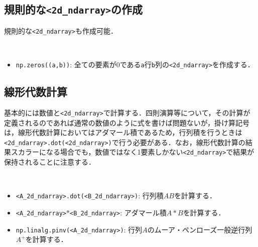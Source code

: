 \subsection{規則的な\texttt{<2d\_ndarray>}の作成}

規則的な\texttt{<2d\_ndarray>}も作成可能．
\begin{gram}　
\begin{itemize}
\item \texttt{np.zeros((a,b))}: 全ての要素が0である\texttt{a}行\texttt{b}列の\texttt{<2d\_ndarray>}を作成する．
\end{itemize}
\end{gram}

\begin{cod}[\texttt{num7.py}]　
}]{code/num7.py}
\vspace{-10pt}
\begin{lstlisting}
A=
[[0. 0. 0.]
 [0. 0. 0.]
 [0. 0. 0.]
 [0. 0. 0.]]
shape=(4, 3)
\end{lstlisting}
\end{cod}
\vspace{-10pt}

\subsection{線形代数計算}

基本的には数値と\texttt{<2d\_ndarray>}で計算する．四則演算等について，その計算が定義されるのであれば通常の数値のように式を書けば問題ないが，掛け算記号は，線形代数計算においてはアダマール積であるため，行列積を行うときは\texttt{<2d\_ndarray>.dot(<2d\_ndarray>)}で行う必要がある．なお，線形代数計算の結果スカラーになる場合でも，数値ではなく1要素しかない\texttt{<2d\_ndarray>}で結果が保持されることに注意する．

\begin{gram}　
\begin{itemize}
\item \texttt{<A\_2d\_ndarray>.dot(<B\_2d\_ndarray>)}: 行列積$AB$を計算する．
\item \texttt{<A\_2d\_ndarray>$*$<B\_2d\_ndarray>}: アダマール積$A*B$を計算する．
\item \texttt{np.linalg.pinv(<A\_2d\_ndarray>)}: 行列$A$のムーア・ペンローズ一般逆行列$A^+$を計算する．
\end{itemize}
\end{gram}

\begin{cod}[\texttt{num6.py}]　
}]{code/num6.py}
\vspace{-10pt}
\begin{lstlisting}
F=
[[  78  156  234  312]
 [ 177  354  531  708]
 [ 276  552  828 1104]
 [ 375  750 1125 1500]]
G=
[[9040]]
H=
[[ -6  10]
 [ 12 -12]
 [-10   6]]
J=
[[0.16666667 0.16666667 0.16666667]
 [0.16666667 0.16666667 0.16666667]]
\end{lstlisting}
\end{cod}
\vspace{-10pt}

